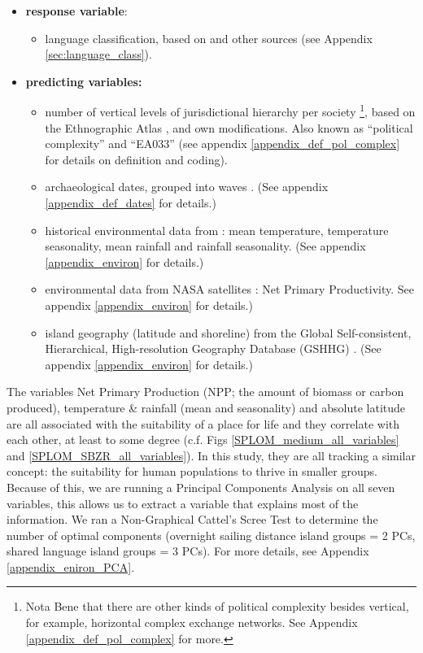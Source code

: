 \documentclass[12pt,letterpaper]{article}
\begin{document}
\begin{itemize}
\item \textbf{response variable}:
\begin{itemize}
\item language classification, based on \citet{glottolog40} and other sources (see Appendix \ref{sec:language_class}).
\end{itemize}
\item \textbf{predicting variables:}
\begin{itemize}
\item number of vertical levels of jurisdictional hierarchy per society \footnote{Nota Bene that there are other kinds of political complexity besides vertical, for example, horizontal complex exchange networks. See Appendix \ref{appendix_def_pol_complex} for more.}, based on the Ethnographic Atlas \citep{gray1998ethnographic, d_place_all}, \citet{sheehan2018coevolution} and own modifications. Also known as ``political complexity'' and ``EA033'' (see appendix \ref{appendix_def_pol_complex} for details on definition and coding).
\item archaeological dates, grouped into waves \citep{intoh2007reconnaissance, intoh2008ongoing, rieth_cochrane_2018, levin_seikel_miles_2019, pol_outliers_stat_art, Napolitano_et_al_yap}. (See appendix \ref{appendix_def_dates} for details.)
\item historical environmental data from \citet{ecoclimate}: mean temperature, temperature seasonality, mean rainfall and rainfall seasonality. (See appendix \ref{appendix_environ} for details.)
\item environmental data from NASA satellites \citep{running2021modis_aqua, running2021modis_terra}: Net Primary Productivity. See appendix \ref{appendix_environ} for details.)
\item island geography (latitude and shoreline) from the Global Self-consistent, Hierarchical, High-resolution Geography Database (GSHHG) \citep{wessel1996global}.  (See appendix \ref{appendix_environ} for details.)
\end{itemize}
\end{itemize}

The variables Net Primary Production (NPP; the amount of biomass or carbon produced), temperature \& rainfall (mean and seasonality) and absolute latitude are all associated with the suitability of a place for life and they correlate with each other, at least to some degree (c.f. Figs \ref{SPLOM_medium_all_variables} and \ref{SPLOM_SBZR_all_variables}). In this study, they are all tracking a similar concept: the suitability for human populations to thrive in smaller groups. Because of this, we are running a Principal Components Analysis on all seven variables, this allows us to extract a variable that explains most of the information. We ran a Non-Graphical Cattel's Scree Test \citep{cattell1966scree, R-nFactors} to determine the number of optimal components (overnight sailing distance island groups = 2 PCs, shared language island groups = 3 PCs). For more details, see Appendix \ref{appendix_eniron_PCA}.
\end{document}
